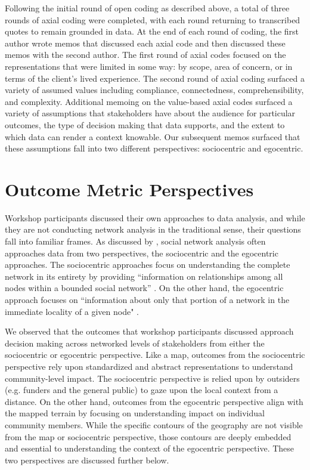 Following the initial round of open coding as described above, a total of three rounds of axial coding were completed, with each round returning to transcribed quotes to remain grounded in data. At the end of each round of coding, the first author wrote memos that discussed each axial code and then discussed these memos with the second author. The first round of axial codes focused on the representations that were limited in some way: by scope, area of concern, or in terms of the client's lived experience. The second round of axial coding surfaced a variety of assumed values including compliance, connectedness, comprehensibility, and complexity. Additional memoing on the value-based axial codes surfaced a variety of assumptions that stakeholders have about the audience for particular outcomes, the type of decision making that data supports, and the extent to which data can render a context knowable. Our subsequent memos surfaced that these assumptions fall into two different perspectives: sociocentric and egocentric.

\section{Outcome Metric Perspectives}

Workshop participants discussed their own approaches to data analysis, and while they are not conducting network analysis in the traditional sense, their questions fall into familiar frames. As discussed by  \citet{Marsden2002EgoSocio}, social network analysis often approaches data from two perspectives, the sociocentric and the egocentric approaches. The sociocentric approaches focus on understanding the complete network in its entirety by providing ``information on relationships among all nodes within a bounded social network'' \citep{Marsden2002EgoSocio}. On the other hand, the egocentric approach focuses on ``information about only that portion of a network in the immediate locality of a given node" \citep{Marsden2002EgoSocio}.

We observed that the outcomes that workshop participants discussed approach decision making across networked levels of stakeholders from either the sociocentric or egocentric perspective. Like a map, outcomes from the sociocentric perspective rely upon standardized and abstract representations to understand community-level impact. The sociocentric perspective is relied upon by outsiders (e.g. funders and the general public) to gaze upon the local context from a distance. On the other hand, outcomes from the egocentric perspective align with the mapped terrain by focusing on understanding impact on individual community members. While the specific contours of the geography are not visible from the map or sociocentric perspective, those contours are deeply embedded and essential to understanding the context of the egocentric perspective. These two perspectives are discussed further below.

